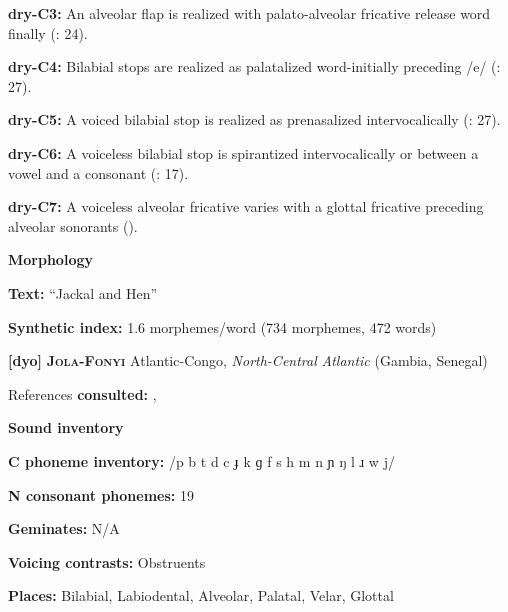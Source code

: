 \textbf{dry-C3:} An alveolar flap is realized with palato-alveolar fricative release word finally (\citealt{KotapishKotapish1978}: 24).



\textbf{dry-C4:} Bilabial stops are realized as palatalized word-initially preceding /e/ (\citealt{KotapishKotapish1978}: 27).



\textbf{dry-C5:} A voiced bilabial stop is realized as prenasalized intervocalically (\citealt{KotapishKotapish1978}: 27).



\textbf{dry-C6:} A voiceless bilabial stop is spirantized intervocalically or between a vowel and a consonant (\citealt{KotapishKotapish1978}: 17).



\textbf{dry-C7:} A voiceless alveolar fricative varies with a glottal fricative preceding alveolar sonorants (\citealt{KotapishKotapish1978}).



\textbf{Morphology}



\textbf{Text:} “Jackal and Hen” \citep[180-192]{Dhakal2012}



\textbf{Synthetic index:} 1.6 morphemes/word (734 morphemes, 472 words)



\textbf{[dyo]}   \textbf{\textsc{Jola-Fonyi}}  Atlantic-Congo, \textit{North-Central} \textit{Atlantic} (Gambia, Senegal)



References \textbf{consulted:} \citet{Lavergne1979}, \citet{Sapir1965}



\textbf{Sound inventory}



\textbf{C phoneme inventory:} /p b t d c ɟ k ɡ f s h m n ɲ ŋ l ɹ w j/



\textbf{N consonant phonemes:} 19



\textbf{Geminates:} N/A



\textbf{Voicing contrasts:} Obstruents



\textbf{Places:} Bilabial, Labiodental, Alveolar, Palatal, Velar, Glottal



